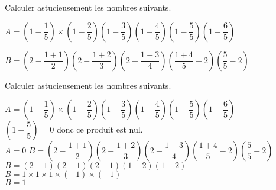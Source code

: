 \begin{exercice*}
    Calculer astucieusement les nombres suivants. 

    \hspace*{-10mm}
    \begin{minipage}{\linewidth}   
        \begin{list}{}{}
            \begin{spacing}{1.5}
                \item \mbox{$A=\left(1-\dfrac15\right)\times\left(1-\dfrac25\right)\left(1-\dfrac35\right)\left(1-\dfrac45\right)\left(1-\dfrac55\right)\left(1-\dfrac65\right)$}
                \item $B=\left(2-\dfrac{1+1}{2}\right)\left(2-\dfrac{1+2}{3}\right)\left(2-\dfrac{1+3}{4}\right)\left(\dfrac{1+4}{5}-2\right)\left(\dfrac{5}{5}-2\right)$
            \end{spacing}
        \end{list}    
    \end{minipage}
\end{exercice*}
\begin{corrige}
    Calculer astucieusement les nombres suivants.
    \begin{spacing}{2}
        \begin{itemize}
            \def\item{}
            \item $A=\left(1-\dfrac15\right)\times\left(1-\dfrac25\right)\left(1-\dfrac35\right)\left(1-\dfrac45\right)\left(1-\dfrac55\right)\left(1-\dfrac65\right)$\\
            {\red $\left(1-\dfrac{5}{5}\right)=0$ donc ce produit est nul.\\$A=0$}
            \item $B=\left(2-\dfrac{1+1}{2}\right)\left(2-\dfrac{1+2}{3}\right)\left(2-\dfrac{1+3}{4}\right)\left(\dfrac{1+4}{5}-2\right)\left(\dfrac{5}{5}-2\right)$\\
            {\red $B=(2-1)(2-1)(2-1)(1-2)(1-2)$\\$B=1\times 1\times 1\times (-1)\times (-1)$\\$B=1$}
        \end{itemize}
    \end{spacing}
\end{corrige}
